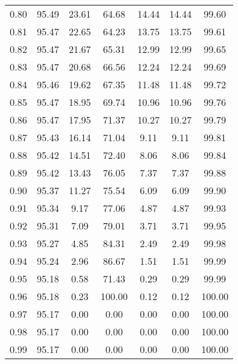 \begin{tabular}{|c|c|c|c|c|c|c|}
      0.80 &     95.49 &     23.61 &      64.68 &   14.44 &      14.44 &         99.60 \\
      0.81 &     95.47 &     22.65 &      64.23 &   13.75 &      13.75 &         99.61 \\
      0.82 &     95.47 &     21.67 &      65.31 &   12.99 &      12.99 &         99.65 \\
      0.83 &     95.47 &     20.68 &      66.56 &   12.24 &      12.24 &         99.69 \\
      0.84 &     95.46 &     19.62 &      67.35 &   11.48 &      11.48 &         99.72 \\
      0.85 &     95.47 &     18.95 &      69.74 &   10.96 &      10.96 &         99.76 \\
      0.86 &     95.47 &     17.95 &      71.37 &   10.27 &      10.27 &         99.79 \\
      0.87 &     95.43 &     16.14 &      71.04 &    9.11 &       9.11 &         99.81 \\
      0.88 &     95.42 &     14.51 &      72.40 &    8.06 &       8.06 &         99.84 \\
      0.89 &     95.42 &     13.43 &      76.05 &    7.37 &       7.37 &         99.88 \\
      0.90 &     95.37 &     11.27 &      75.54 &    6.09 &       6.09 &         99.90 \\
      0.91 &     95.34 &      9.17 &      77.06 &    4.87 &       4.87 &         99.93 \\
      0.92 &     95.31 &      7.09 &      79.01 &    3.71 &       3.71 &         99.95 \\
      0.93 &     95.27 &      4.85 &      84.31 &    2.49 &       2.49 &         99.98 \\
      0.94 &     95.24 &      2.96 &      86.67 &    1.51 &       1.51 &         99.99 \\
      0.95 &     95.18 &      0.58 &      71.43 &    0.29 &       0.29 &         99.99 \\
      0.96 &     95.18 &      0.23 &     100.00 &    0.12 &       0.12 &        100.00 \\
      0.97 &     95.17 &      0.00 &       0.00 &    0.00 &       0.00 &        100.00 \\
      0.98 &     95.17 &      0.00 &       0.00 &    0.00 &       0.00 &        100.00 \\
      0.99 &     95.17 &      0.00 &       0.00 &    0.00 &       0.00 &        100.00 \\
\bottomrule
\end{tabular}
